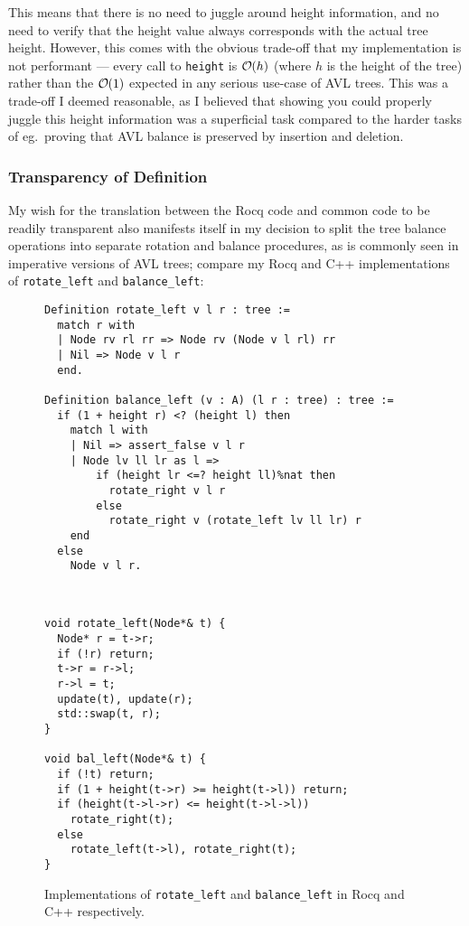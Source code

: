 \documentclass[acmsmall, authorversion, nonacm, overload]{acmart}
\DeclareRobustCommand{\bigO}{%
  \text{\usefont{OMS}{cmsy}{m}{n}O}%
}
\begin{document}
This means that there is no need to juggle around height information,
and no need to verify that the height value always corresponds with the actual tree height.
However, this comes with the obvious trade-off that my implementation is not performant --- every call to
\texttt{height} is $\bigO(h)$ (where $h$ is the height of the tree)
rather than the $\bigO(1)$ expected in any serious use-case of AVL trees.
This was a trade-off I deemed reasonable, as I believed that showing you could properly juggle this height information
was a superficial task compared to the harder tasks of eg.\ proving that AVL balance is preserved
by insertion and deletion.

\subsubsection{Transparency of Definition}
My wish for the translation between the Rocq code and common code to be readily transparent
also manifests itself in my decision to split the tree balance operations into separate
rotation and balance procedures, as is commonly seen in imperative versions of AVL trees;
compare my Rocq and C++ implementations of \texttt{rotate_left} and \texttt{balance_left}:
\begin{figure}[h!]
  \begin{minipage}{0.5\linewidth}
    \centering
    \begin{verbatim}
Definition rotate_left v l r : tree :=
  match r with
  | Node rv rl rr => Node rv (Node v l rl) rr
  | Nil => Node v l r
  end.

Definition balance_left (v : A) (l r : tree) : tree :=
  if (1 + height r) <? (height l) then
    match l with
    | Nil => assert_false v l r
    | Node lv ll lr as l =>
        if (height lr <=? height ll)%nat then
          rotate_right v l r
        else
          rotate_right v (rotate_left lv ll lr) r
    end
  else
    Node v l r.

    \end{verbatim}
  \end{minipage}
  ~\qquad\qquad~
  \begin{minipage}{0.5\linewidth}
    \centering
    \begin{verbatim}
void rotate_left(Node*& t) {
  Node* r = t->r;
  if (!r) return;
  t->r = r->l;
  r->l = t;
  update(t), update(r);
  std::swap(t, r);
}

void bal_left(Node*& t) {
  if (!t) return;
  if (1 + height(t->r) >= height(t->l)) return;
  if (height(t->l->r) <= height(t->l->l))
    rotate_right(t);
  else
    rotate_left(t->l), rotate_right(t);
}
    \end{verbatim}
  \end{minipage}
  \caption{Implementations of \texttt{rotate_left} and \texttt{balance_left} in Rocq and C++ respectively.}
\end{figure}
\end{document}
